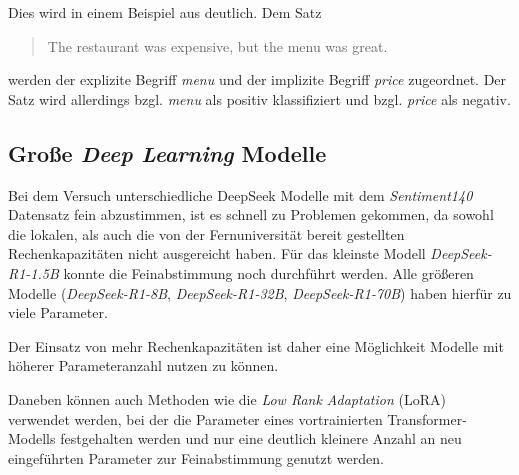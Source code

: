 Dies wird in einem Beispiel aus \cite{Hua_2024} deutlich. Dem Satz
\begin{quote}
\glqq The restaurant was expensive, but the menu was great.\grqq
\end{quote}
werden der explizite Begriff \textit{menu} und der implizite Begriff \textit{price} zugeordnet.
Der Satz wird allerdings bzgl. \textit{menu} als positiv klassifiziert und bzgl. \textit{price} als negativ.


\subsection{Große \textit{Deep Learning} Modelle}
Bei dem Versuch unterschiedliche DeepSeek Modelle mit dem \textit{Sentiment140} Datensatz fein abzustimmen, ist es schnell zu Problemen gekommen, da sowohl die lokalen, als auch die von der Fernuniversität bereit gestellten Rechenkapazitäten nicht ausgereicht haben.
Für das kleinste Modell \textit{DeepSeek-R1-1.5B} konnte die Feinabstimmung noch durchführt werden.
Alle größeren Modelle (\textit{DeepSeek-R1-8B}, \textit{DeepSeek-R1-32B}, \textit{DeepSeek-R1-70B}) haben hierfür zu viele Parameter.

Der Einsatz von mehr Rechenkapazitäten ist daher eine Möglichkeit Modelle mit höherer Parameteranzahl nutzen zu können.

Daneben können auch Methoden wie die \textit{Low Rank Adaptation} (LoRA) \cite{lora2021} verwendet werden, bei der die Parameter eines vortrainierten Transformer-Modells festgehalten werden und nur eine deutlich kleinere Anzahl an neu eingeführten Parameter zur Feinabstimmung genutzt werden.
